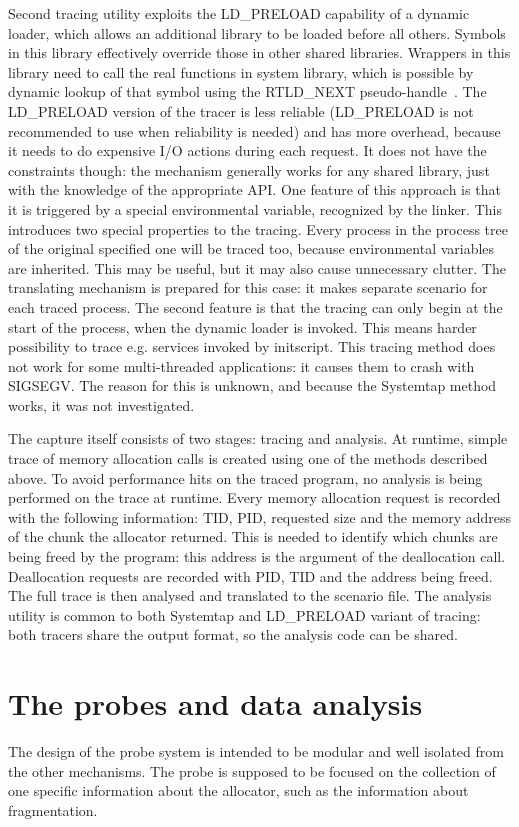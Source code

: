 Second tracing utility exploits the LD\_PRELOAD capability of a dynamic loader, which allows an additional library to be loaded before all others. Symbols in this library effectively override those in other shared libraries. Wrappers in this library need to call the real functions in system library, which is possible by dynamic lookup of that symbol using the RTLD\_NEXT pseudo-handle~\cite{man-dlopen}. The LD\_PRELOAD version of the tracer is less reliable (LD\_PRELOAD is not recommended to use when reliability is needed) and has more overhead, because it needs to do expensive I/O actions during each request. It does not have the constraints though: the mechanism generally works for any shared library, just with the knowledge of the appropriate API. One feature of this approach is that it is triggered by a special environmental variable, recognized by the linker. This introduces two special properties to the tracing. Every process in the process tree of the original specified one will be traced too, because environmental variables are inherited. This may be useful, but it may also cause unnecessary clutter. The translating mechanism is prepared for this case: it makes separate scenario for each traced process. The second feature is that the tracing can only begin at the start of the process, when the dynamic loader is invoked. This means harder possibility to trace e.g. services invoked by initscript. This tracing method does not work for some multi-threaded applications: it causes them to crash with SIGSEGV. The reason for this is unknown, and because the Systemtap method works, it was not investigated.

The capture itself consists of two stages: tracing and analysis. At runtime, simple trace of memory allocation calls is created using one of the methods described above. To avoid performance hits on the traced program, no analysis is being performed on the trace at runtime. Every memory allocation request is recorded with the following information: TID, PID, requested size and the memory address of the chunk the allocator returned. This is needed to identify which chunks are being freed by the program: this address is the argument of the deallocation call. Deallocation requests are recorded with PID, TID and the address being freed. The full trace is then analysed and translated to the scenario file. The analysis utility is common to both Systemtap and LD\_PRELOAD variant of tracing: both tracers share the output format, so the analysis code can be shared.

\section{The probes and data analysis}
The design of the probe system is intended to be modular and well isolated from the other mechanisms. The probe is supposed to be focused on the collection of one specific information about the allocator, such as the information about fragmentation.

